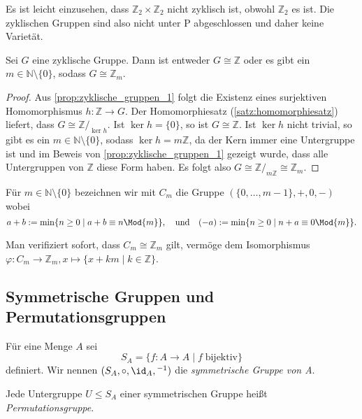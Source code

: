\begin{remark}
    Es ist leicht einzusehen, dass $\mathbb{Z}_2 \times \mathbb{Z}_2$ nicht zyklisch ist, obwohl $\mathbb{Z}_2$ es ist. Die zyklischen Gruppen sind also nicht unter P abgeschlossen und daher keine Varietät.
\end{remark}

\begin{proposition}
    Sei $G$ eine zyklische Gruppe. Dann ist entweder $G \cong \mathbb{Z}$ oder es gibt ein $m \in \mathbb{N} \setminus \{ 0 \}$, sodass $G \cong \mathbb{Z}_m$.
\end{proposition}
\begin{proof}
    Aus \cref{prop:zyklische_gruppen_1} folgt die Existenz eines surjektiven Homomorphismus $h: \mathbb{Z} \to G$. Der Homomorphiesatz (\ref{satz:homomorphiesatz}) liefert, dass $G \cong \mathbb{Z}/_{\ker h}$. Ist $\ker h = \{0\}$, so ist $G \cong \mathbb{Z}$. Ist $\ker h$ nicht trivial, so gibt es ein $m \in \mathbb{N} \setminus \{ 0 \}$, sodass $\ker h = m\mathbb{Z}$, da der Kern immer eine Untergruppe ist und im Beweis von \cref{prop:zyklische_gruppen_1} gezeigt wurde, dass alle Untergruppen von $\mathbb{Z}$ diese Form haben. Es folgt also $G \cong \mathbb{Z}/_{m\mathbb{Z}} \cong \mathbb{Z}_m$.
\end{proof}

\begin{definition}
    Für $m\in\mathbb{N}\setminus\{0\}$ bezeichnen wir mit $C_m$ die Gruppe $(\{0,\ldots,m-1\},+,0,-)$ wobei
    $$ a+b := \min\{n\geq 0\mid a+b \equiv n \Mod{m} \}, \quad \textrm{und} \quad (-a) := \min \{ n \geq 0 \mid n + a \equiv 0 \Mod{m} \}. $$
\end{definition}

Man verifiziert sofort, dass $C_m\cong\mathbb{Z}_m$ gilt, vermöge dem Isomorphismus $\varphi:C_m\to\mathbb{Z}_m,x\mapsto\{x+km\mid k\in\mathbb{Z}\}$.

\subsection{Symmetrische Gruppen und Permutationsgruppen}

\begin{definition}
    Für eine Menge $A$ sei
    $$ S_A = \{f: A \to A \mid f \;\text{bijektiv}\}$$
    definiert. Wir nennen $(S_A, \circ, \id_A, {}^{-1})$ die \emph{symmetrische Gruppe von A}.

    Jede Untergruppe $U \le S_A$ einer symmetrischen Gruppe heißt \emph{Permutationsgruppe}.
\end{definition}

